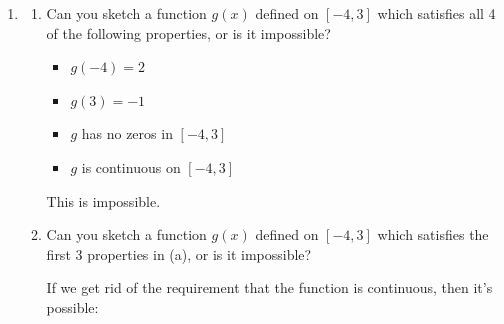 \documentclass{article}
\begin{document}
\begin{enumerate}[resume]
\begin{enumerate}

    \begin{problem}[1in]
      If $f(x)$ is differentiable at $x = a$, then $f(x)$ is continuous
      at $x = a$.
    \end{problem}

    \begin{solution}
      This is true.
    \end{solution}

  \end{enumerate}

\item 
  \begin{enumerate}
  \item


    \begin{problem}[\vfill]
      Can you sketch a function $g(x)$ defined on $[-4, 3]$ which satisfies all 4 of the following properties, or is it impossible?
      \begin{itemize}[nosep]
      \item $g(-4) = 2$
      \item $g(3) = -1$
      \item $g$ has no zeros in $[-4, 3]$
      \item $g$ is continuous on $[-4, 3]$
      \end{itemize}
    \end{problem}

    \begin{solution}
      This is impossible. 
    \end{solution}

  \item
    \begin{problem}[\vfill\newpage]
      Can you sketch a function $g(x)$ defined on $[-4, 3]$ which satisfies the first 3 properties in (a), or is it impossible?
    \end{problem}

    \begin{solution}
      If we get rid of the requirement that the function is continuous, then it's possible:
      \begin{center}
      \end{center}
    \end{solution}


\end{enumerate}
\end{enumerate}
\end{document}
